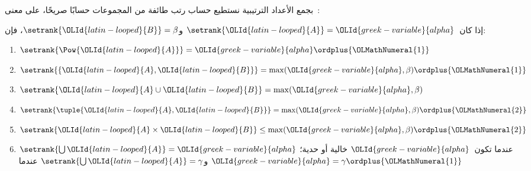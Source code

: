 \documentclass[../../../include/open-logic-section]{subfiles}
\begin{document}

بجمع الأعداد الترتيبية نستطيع حساب رتب طائفة من المجموعات حسابًا
صريحًا، على معنى~:

\begin{lem}
إذا كان~$\setrank{{\OLId{latin-looped}{A}}} = {\OLId{greek-variable}{alpha}}$ و$\setrank{{\OLId{latin-looped}{B}}} = \beta$، فإن:
\begin{enumerate}
	\item{} $\setrank{\Pow{{\OLId{latin-looped}{A}}}} = {\OLId{greek-variable}{alpha}}\ordplus {\OLMathNumeral{1}}$
	\item{} $\setrank{\{{\OLId{latin-looped}{A}}, {\OLId{latin-looped}{B}}\}} = \max({\OLId{greek-variable}{alpha}},
	\beta) \ordplus {\OLMathNumeral{1}}$
	\item{} $\setrank{{\OLId{latin-looped}{A}} \cup {\OLId{latin-looped}{B}}} = \max({\OLId{greek-variable}{alpha}},
	\beta)$
	\item{} $\setrank{\tuple{{\OLId{latin-looped}{A}},{\OLId{latin-looped}{B}}}} = \max({\OLId{greek-variable}{alpha}},
	\beta) \ordplus {\OLMathNumeral{2}}$
	\item{} $\setrank{{\OLId{latin-looped}{A}} \times {\OLId{latin-looped}{B}}} \leq \max({\OLId{greek-variable}{alpha}},
	\beta) \ordplus {\OLMathNumeral{2}}$
	\item{} $\setrank{\bigcup {\OLId{latin-looped}{A}}} = {\OLId{greek-variable}{alpha}}$ عندما
	تكون~${\OLId{greek-variable}{alpha}}$ خالية أو حدية؛ و$\setrank{\bigcup {\OLId{latin-looped}{A}}} = \gamma$ عندما
	${\OLId{greek-variable}{alpha}} = \gamma\ordplus {\OLMathNumeral{1}}$
\end{enumerate}
\end{lem}
\end{document}
